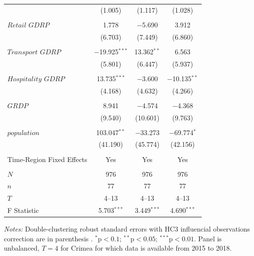 \documentclass[12pt]{article}
\numberwithin{equation}{section}
\numberwithin{table}{section}
\numberwithin{figure}{section}
\begin{document}
\begin{table}[!htbp]
\begin{threeparttable}
\begin{tabular}{@{\extracolsep{5pt}}lccc}
  & (1.005) & (1.117) & (1.028) \\ 
  & & & \\ 
 $\textit{Retail GDRP}$ & 1.778 & $-$5.690 & 3.912 \\ 
  & (6.703) & (7.449) & (6.860) \\ 
  & & & \\ 
 $\textit{Transport GDRP}$ & $-$19.925$^{***}$ & 13.362$^{**}$ & 6.563 \\ 
  & (5.801) & (6.447) & (5.937) \\ 
  & & & \\ 
 $\textit{Hospitality GDRP}$& 13.735$^{***}$ & $-$3.600 & $-$10.135$^{**}$ \\ 
  & (4.168) & (4.632) & (4.266) \\ 
  & & & \\ 
  $\textit{GRDP}$ & 8.941 & $-$4.574 & $-$4.368 \\ 
  & (9.540) & (10.601) & (9.763) \\ 
  & & & \\ 
 $\textit{population}$ & 103.047$^{**}$ & $-$33.273 & $-$69.774$^{*}$ \\ 
  & (41.190) & (45.774) & (42.156) \\ 
  & & & \\ 
  Time-Region Fixed Effects & Yes& Yes& Yes \\
  \hline \\[-1.8ex] 
  $N$ & 976 & 976 & 976 \\ 
  $n$ & 77& 77& 77\\
  $T$ & 4--13 & 4--13& 4--13\\
  F Statistic & 5.703$^{***}$ & 3.449$^{***}$ & 4.690$^{***}$ \\ 
  \hline 
  \hline 
  \end{tabular} 
  \begin{tablenotes}[flushleft]
    \item \textit{Notes:} Double-clustering robust standard errors with HC3 influencial observations correction are in parenthesis \citep{Thompson2011,Cameron2011}. $^{*}\mathrm{p}<0.1$; $^{**}\mathrm{p}<0.05$; $^{***}\mathrm{p}<0.01$. Panel is unbalanced, $T=4$ for Crimea for which data is available from 2015 to 2018.
  \end{tablenotes}
\end{threeparttable}
  \end{table} 

\newpage 
{}


\appendix
\end{document}
